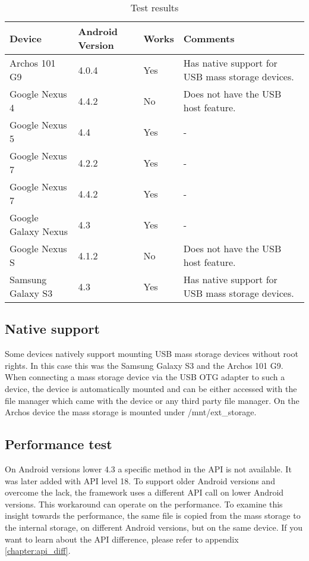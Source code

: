 \begin{table}[ht]
\caption{Test results}
\centering
\begin{tabular}{|l|l|l|p{7cm}|}
\hline\hline
\textbf{Device} & \textbf{Android Version} & \textbf{Works} & \textbf{Comments} \\ \hline
Archos 101 G9 & 4.0.4 & Yes & Has native support for USB mass storage devices. \\ \hline
Google Nexus 4 & 4.4.2 & No & Does not have the USB host feature\cite{nexus_4_usb_host}. \\ \hline
Google Nexus 5 & 4.4 & Yes & - \\ \hline
Google Nexus 7 & 4.2.2 & Yes & - \\ \hline
Google Nexus 7 & 4.4.2 & Yes & - \\ \hline
Google Galaxy Nexus & 4.3 & Yes & - \\ \hline
Google Nexus S & 4.1.2 & No & Does not have the USB host feature. \\ \hline
Samsung Galaxy S3 & 4.3 & Yes & Has native support for USB mass storage devices. \\ \hline
\end{tabular}
\label{table:test_results}
\end{table}

\subsection{Native support}

Some devices natively support mounting USB mass storage devices without root rights. In this case this was the Samsung Galaxy S3 and the Archos 101 G9. When connecting a mass storage device via the USB OTG adapter to such a device, the device is automatically mounted and can be either accessed with the file manager which came with the device or any third party file manager. On the Archos device the mass storage is mounted under /mnt/ext\_storage.

\subsection{Performance test}

On Android versions lower 4.3 a specific method in the API is not available. It was later added with API level 18. To support older Android versions and overcome the lack, the framework uses a different API call on lower Android versions. This workaround can operate on the performance. To examine this insight towards the performance, the same file is copied from the mass storage to the internal storage, on different Android versions, but on the same device. If you want to learn about the API difference, please refer to appendix \ref{chapter:api_diff}.

